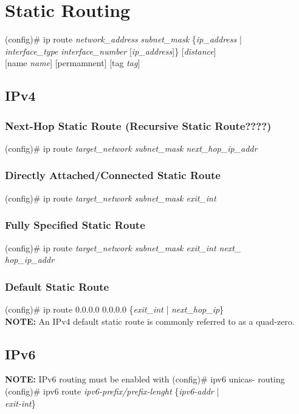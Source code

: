 \section{Static Routing}
(config)\# ip route \textit{network\_address} \textit{subnet\_mask} \{\textit{ip\_address} | \\\textit{interface\_type} \textit{interface\_number} [\textit{ip\_address}]\} [\textit{distance}] \\{[name \textit{name}]} [permamnent] [tag \textit{tag}]

\subsection{IPv4}
\subsubsection*{Next-Hop Static Route (Recursive Static Route????)}
(config)\# ip route \textit{target\_network subnet\_mask next\_hop\_ip\_addr}
\subsubsection*{Directly Attached/Connected Static Route}
(config)\# ip route \textit{target\_network subnet\_mask exit\_int}
\subsubsection*{Fully Specified Static Route}
(config)\# ip route \textit{target\_network subnet\_mask exit\_int next\_\\hop\_ip\_addr}
\subsubsection*{Default Static Route}
(config)\# ip route 0.0.0.0 0.0.0.0 \{\textit{exit\_int} | \textit{next\_hop\_ip}\}\\
\textrm{\textbf{NOTE:} An IPv4 default static route is commonly referred to as a quad-zero.}

\subsection{IPv6}
\textrm{\textbf{NOTE:} IPv6 routing must be enabled with} (config)\# ipv6 unicas- routing\vspace{11pt}\\
(config)\# ipv6 route \textit{ipv6-prefix/prefix-lenght} \{\textit{ipv6-addr} | \\\textit{exit-int}\}
